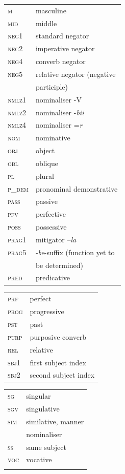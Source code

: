 \documentclass[output=paper,colorlinks,citecolor=brown,
]{langsci/langscibook}
\begin{document}
\begin{tabularx}{.5\textwidth}{@{}lQ@{}}
\textsc{m} &  masculine\\
\textsc{mid} &  middle\\
\textsc{neg1} &  standard negator\\
\textsc{neg2} &  imperative negator\\
\textsc{neg4} &  converb negator\\
\textsc{neg5} &  relative negator (negative\\ &  participle)\\
\textsc{nmlz1} &  nominaliser -V\\
\textsc{nmlz2} &  nominaliser -\textit{bii}\\
\textsc{nmlz4} &  nominaliser =\textit{r}\\
\textsc{nom} &  nominative\\
\textsc{obj} &  object\\
\textsc{obl} &  oblique\\
\textsc{pl} &  plural\\
\textsc{p\_dem} &  pronominal demonstrative\\
\textsc{pass} &  passive\\
\textsc{pfv} &  perfective\\
\textsc{poss} &  possessive\\
\textsc{prag1} &  mitigator –\textit{la}\\
\textsc{prag5} &  -\textit{be}-suffix (function yet to\\ &  be determined)\\
\textsc{pred} &  predicative\end{tabularx}

\begin{tabularx}{.5\textwidth}{@{}lQ@{}}
\textsc{prf} &  perfect\\
\textsc{prog} &  progressive\\
\textsc{pst} &  past\\
\textsc{purp} &  purposive converb\\
\textsc{rel} &  relative\\
\textsc{sbj1} &  first subject index\\
\textsc{sbj2} &  second subject index\end{tabularx}
\begin{tabularx}{.5\textwidth}{@{}lQ@{}}
\textsc{sg} &  singular\\
\textsc{sgv} &  singulative\\
\textsc{sim} &  similative, manner \\ &  nominaliser\\
\textsc{ss} &  same subject\\
\textsc{voc} &  vocative\\\\\end{tabularx}
\end{document}
